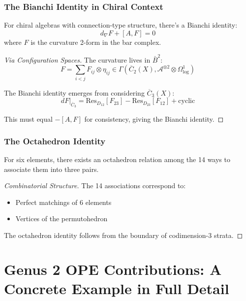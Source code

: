 \subsubsection{The Bianchi Identity in Chiral Context}

\begin{theorem}
For chiral algebras with connection-type structure, there's a Bianchi identity:
$$d_\nabla F + [A, F] = 0$$
where $F$ is the curvature 2-form in the bar complex.
\end{theorem}

\begin{proof}[Via Configuration Spaces]
The curvature lives in $\bar{B}^2$:
$$F = \sum_{i<j} F_{ij} \otimes \eta_{ij} \in \Gamma(\overline{C}_2(X), \mathcal{A}^{\otimes 2} \otimes \Omega^1_{\text{log}})$$

The Bianchi identity emerges from considering $\overline{C}_3(X)$:
$$dF|_{\overline{C}_3} = \text{Res}_{D_{12}}[F_{23}] - \text{Res}_{D_{23}}[F_{12}] + \text{cyclic}$$

This must equal $-[A,F]$ for consistency, giving the Bianchi identity.
\end{proof}

\subsubsection{The Octahedron Identity}

\begin{theorem}
For six elements, there exists an octahedron relation among the 14 ways to associate them into three pairs.
\end{theorem}

\begin{proof}[Combinatorial Structure]
The 14 associations correspond to:
\begin{itemize}
\item Perfect matchings of 6 elements
\item Vertices of the permutohedron
\end{itemize}
The octahedron identity follows from the boundary of codimension-3 strata.
\end{proof}

\section{Genus 2 OPE Contributions: A Concrete Example in Full Detail}
\label{sec:genus_2_ope_example}

